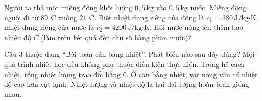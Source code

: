 \begin{ex}
Người ta thả một miếng đồng khối lượng $0,5\,\mathrm{kg}$ vào $0,5\,\mathrm{kg}$ nước. 
 Miếng đồng nguội đi từ $89^\circ\mathrm{C}$ xuống $21^\circ\mathrm{C}$. 
 Biết nhiệt dung riêng của đồng là $c_1 = 380\,\text{J/kg·K}$, nhiệt dung riêng của nước là $c_2 = 4200\,\text{J/kg·K}$. 
 Hỏi nước nóng lên thêm bao nhiêu độ $C$ (làm tròn kết quả đến chữ số hàng phần mười)?
\end{ex}

\begin{ex}
Câu 3 thuộc dạng “Bài toán cân bằng nhiệt”. Phát biểu nào sau đây đúng?
\choice
{Mọi quá trình nhiệt học đều không phụ thuộc điều kiện thực hiện.}
{\True Trong hệ cách nhiệt, tổng nhiệt lượng trao đổi bằng 0.}
{Ở cân bằng nhiệt, vật nóng vẫn có nhiệt độ cao hơn vật lạnh.}
{Nhiệt lượng và nhiệt độ là hai đại lượng hoàn toàn giống nhau.}
\end{ex}


